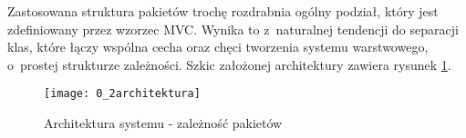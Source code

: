 \clearpage
Zastosowana struktura pakietów trochę rozdrabnia ogólny podział, który jest zdefiniowany przez wzorzec MVC. Wynika to z~naturalnej tendencji do separacji klas, które łączy wspólna cecha oraz chęci tworzenia systemu warstwowego, o~prostej strukturze zależności. Szkic założonej architektury zawiera rysunek \ref{obr02}.

\begin{figure}[!h]
\centering
    \texttt{[image: 0\_2architektura]}
    \caption{Architektura systemu - zależność pakietów}
    \label{obr02}
\end{figure}

